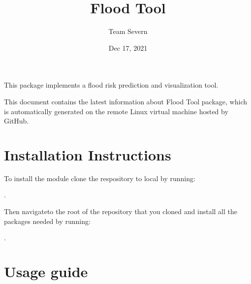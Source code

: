 \documentclass[letterpaper,10pt,english]{sphinxmanual}
\title{Flood Tool}
\date{Dec 17, 2021}
\author{Team Severn}
\begin{document}
\pagestyle{empty}
\sphinxmaketitle
\pagestyle{plain}
\sphinxtableofcontents
\pagestyle{normal}
\label{\detokenize{index::doc}}


\sphinxAtStartPar
This package implements a flood risk prediction and visualization tool.

\sphinxAtStartPar
This document contains the latest information about Flood Tool package, which is automatically generated on the remote Linux virtual machine hosted by GitHub.


\chapter{Installation Instructions}
\label{\detokenize{index:installation-instructions}}
\sphinxAtStartPar
To install the module  clone the respository to local by running:

\sphinxAtStartPar
{}.

\sphinxAtStartPar
Then navigateto the root of the repository that you cloned and install all the packages needed by
running:

\sphinxAtStartPar
{}

\sphinxAtStartPar
{}.


\chapter{Usage guide}
\label{\detokenize{index:usage-guide}}
\sphinxAtStartPar
{}
\end{document}
